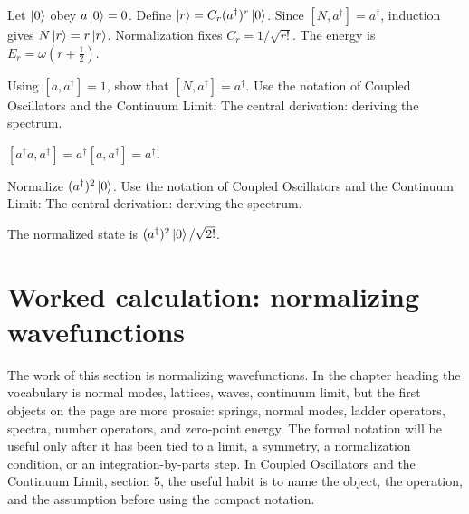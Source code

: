 \begin{example}
Let \(\left|0\right\rangle\) obey \(a\left|0\right\rangle=0\).  Define \(\left|r\right\rangle=C_r(a^\dagger)^r\left|0\right\rangle\).  Since \([N,a^\dagger]=a^\dagger\), induction gives \(N\left|r\right\rangle=r\left|r\right\rangle\).  Normalization fixes \(C_r=1/\sqrt{r!}\).  The energy is \(E_r=\omega(r+\frac12)\).
\end{example}



\begin{exercise}
Using \([a,a^\dagger]=1\), show that \([N,a^\dagger]=a^\dagger\).  Use the notation of Coupled Oscillators and the Continuum Limit: The central derivation: deriving the spectrum.
\begin{answer}
\([a^\dagger a,a^\dagger]=a^\dagger[a,a^\dagger]=a^\dagger\).
\end{answer}
\end{exercise}

\begin{exercise}
Normalize \((a^\dagger)^2\left|0\right\rangle\).  Use the notation of Coupled Oscillators and the Continuum Limit: The central derivation: deriving the spectrum.
\begin{answer}
The normalized state is \((a^\dagger)^2\left|0\right\rangle/\sqrt{2!}\).
\end{answer}
\end{exercise}



\section{Worked calculation: normalizing wavefunctions}













The work of this section is normalizing wavefunctions.  In the chapter heading the vocabulary is normal modes, lattices, waves, continuum limit, but the first objects on the page are more prosaic: springs, normal modes, ladder operators, spectra, number operators, and zero-point energy.  The formal notation will be useful only after it has been tied to a limit, a symmetry, a normalization condition, or an integration-by-parts step.  In Coupled Oscillators and the Continuum Limit, section 5, the useful habit is to name the object, the operation, and the assumption before using the compact notation.

